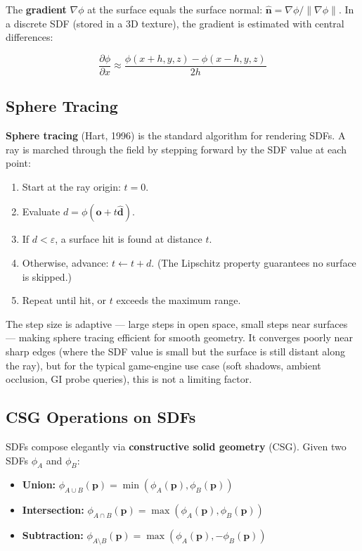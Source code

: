 \documentclass[
  11pt,
  letterpaper,
  DIV=11,
  numbers=noendperiod,
  twoside,
  open=right]{scrreprt}
\providecommand{\tightlist}{%
  \setlength{\itemsep}{0pt}\setlength{\parskip}{0pt}}
\begin{document}
The \textbf{gradient} \(\nabla\phi\) at the surface equals the surface
normal: \(\hat{\mathbf{n}} = \nabla\phi / \|\nabla\phi\|\). In a
discrete SDF (stored in a 3D texture), the gradient is estimated with
central differences:

\[
\frac{\partial \phi}{\partial x} \approx \frac{\phi(x + h, y, z) - \phi(x - h, y, z)}{2h}
\]

\subsection{Sphere Tracing}\label{sphere-tracing}

\textbf{Sphere tracing} (Hart, 1996) is the standard algorithm for
rendering SDFs. A ray is marched through the field by stepping forward
by the SDF value at each point:

\begin{enumerate}
\def\labelenumi{\arabic{enumi}.}
\tightlist
\item
  Start at the ray origin: \(t = 0\).
\item
  Evaluate \(d = \phi(\mathbf{o} + t \hat{\mathbf{d}})\).
\item
  If \(d < \varepsilon\), a surface hit is found at distance \(t\).
\item
  Otherwise, advance: \(t \leftarrow t + d\). (The Lipschitz property
  guarantees no surface is skipped.)
\item
  Repeat until hit, or \(t\) exceeds the maximum range.
\end{enumerate}

The step size is adaptive --- large steps in open space, small steps
near surfaces --- making sphere tracing efficient for smooth geometry.
It converges poorly near sharp edges (where the SDF value is small but
the surface is still distant along the ray), but for the typical
game-engine use case (soft shadows, ambient occlusion, GI probe
queries), this is not a limiting factor.

\subsection{CSG Operations on SDFs}\label{csg-operations-on-sdfs}

SDFs compose elegantly via \textbf{constructive solid geometry} (CSG).
Given two SDFs \(\phi_A\) and \(\phi_B\):

\begin{itemize}
\tightlist
\item
  \textbf{Union:}
  \(\phi_{A \cup B}(\mathbf{p}) = \min(\phi_A(\mathbf{p}), \phi_B(\mathbf{p}))\)
\item
  \textbf{Intersection:}
  \(\phi_{A \cap B}(\mathbf{p}) = \max(\phi_A(\mathbf{p}), \phi_B(\mathbf{p}))\)
\item
  \textbf{Subtraction:}
  \(\phi_{A \setminus B}(\mathbf{p}) = \max(\phi_A(\mathbf{p}), -\phi_B(\mathbf{p}))\)
\end{itemize}
\end{document}
